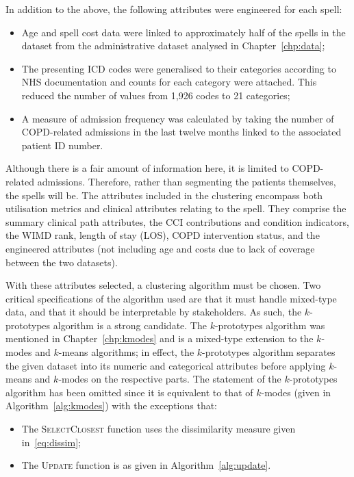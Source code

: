 In addition to the above, the following attributes were engineered for each
spell:

\begin{itemize}
    \item Age and spell cost data were linked to approximately half of the
        spells in the dataset from the administrative dataset analysed in
        Chapter~\ref{chp:data};
    \item The presenting ICD codes were generalised to their categories
        according to NHS documentation and counts for each category were
        attached. This reduced the number of values from
        1,926 codes to 21 categories;
    \item A measure of admission frequency was calculated by taking the number
        of COPD-related admissions in the last twelve months linked to the
        associated patient ID number.
\end{itemize}

Although there is a fair amount of information here, it is limited to
COPD-related admissions. Therefore, rather than segmenting the patients
themselves, the spells will be. The attributes included in the clustering
encompass both utilisation metrics and clinical attributes relating to the
spell. They comprise the summary clinical path attributes, the CCI contributions
and condition indicators, the WIMD rank, length of stay (LOS), COPD intervention
status, and the engineered attributes (not including age and costs due to lack
of coverage between the two datasets).

With these attributes selected, a clustering algorithm must be chosen. Two
critical specifications of the algorithm used are that it must handle mixed-type
data, and that it should be interpretable by stakeholders. As such, the
\(k\)-prototypes algorithm is a strong candidate. The \(k\)-prototypes algorithm
was mentioned in Chapter~\ref{chp:kmodes} and is a mixed-type extension to the
\(k\)-modes and \(k\)-means algorithms; in effect, the \(k\)-prototypes
algorithm separates the given dataset into its numeric and categorical
attributes before applying \(k\)-means and \(k\)-modes on the respective parts.
The statement of the \(k\)-prototypes algorithm has been omitted since it is
equivalent to that of \(k\)-modes (given in Algorithm~\ref{alg:kmodes}) with the
exceptions that:

\begin{itemize}
    \item The \textsc{SelectClosest} function uses the dissimilarity measure
        given in~\eqref{eq:dissim};
    \item The \textsc{Update} function is as given in
        Algorithm~\ref{alg:update}.
\end{itemize}

